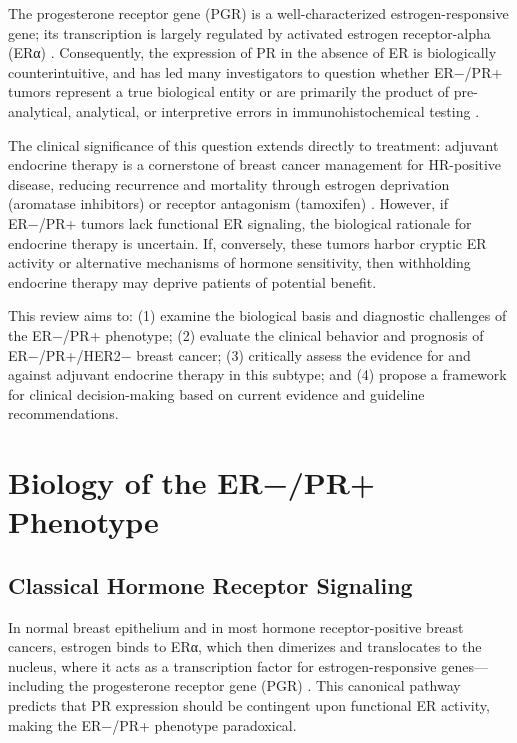\documentclass{article}
\begin{document}
The progesterone receptor gene (PGR) is a well-characterized estrogen-responsive gene; its transcription is largely regulated by activated estrogen receptor-alpha (ERα) \citep{horwitz1978}. Consequently, the expression of PR in the absence of ER is biologically counterintuitive, and has led many investigators to question whether ER−/PR+ tumors represent a true biological entity or are primarily the product of pre-analytical, analytical, or interpretive errors in immunohistochemical testing \citep{kunc2018, hefti2014}.

The clinical significance of this question extends directly to treatment: adjuvant endocrine therapy is a cornerstone of breast cancer management for HR-positive disease, reducing recurrence and mortality through estrogen deprivation (aromatase inhibitors) or receptor antagonism (tamoxifen) \citep{ebctcg2011}. However, if ER−/PR+ tumors lack functional ER signaling, the biological rationale for endocrine therapy is uncertain. If, conversely, these tumors harbor cryptic ER activity or alternative mechanisms of hormone sensitivity, then withholding endocrine therapy may deprive patients of potential benefit.

This review aims to: (1) examine the biological basis and diagnostic challenges of the ER−/PR+ phenotype; (2) evaluate the clinical behavior and prognosis of ER−/PR+/HER2− breast cancer; (3) critically assess the evidence for and against adjuvant endocrine therapy in this subtype; and (4) propose a framework for clinical decision-making based on current evidence and guideline recommendations.

\section{Biology of the ER−/PR+ Phenotype}

\subsection{Classical Hormone Receptor Signaling}

In normal breast epithelium and in most hormone receptor-positive breast cancers, estrogen binds to ERα, which then dimerizes and translocates to the nucleus, where it acts as a transcription factor for estrogen-responsive genes—including the progesterone receptor gene (PGR) \citep{horwitz1978}. This canonical pathway predicts that PR expression should be contingent upon functional ER activity, making the ER−/PR+ phenotype paradoxical.
\end{document}
